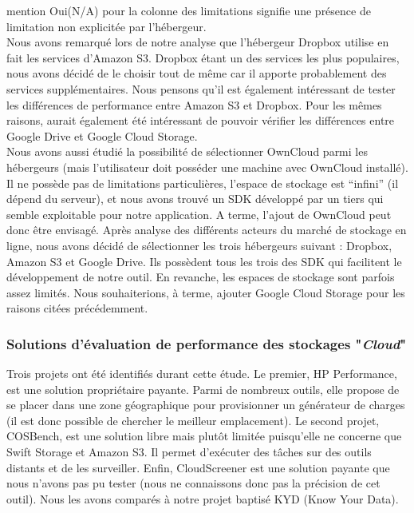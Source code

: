 \documentclass[10pt]{article}
\begin{document}
mention Oui(N/A) pour la colonne des limitations signifie une présence de
limitation non explicitée par l'hébergeur.\\

Nous avons remarqué lors de notre analyse que l’hébergeur Dropbox utilise en
fait les services d'Amazon S3. Dropbox étant un des services les plus
populaires, nous avons décidé de le choisir tout de même car il apporte
probablement des services supplémentaires. Nous pensons qu’il est également
intéressant de tester les différences de performance entre Amazon S3 et Dropbox.
Pour les mêmes raisons, aurait également été intéressant de pouvoir vérifier les
différences entre Google Drive et Google Cloud Storage.\\

Nous avons aussi étudié la possibilité de sélectionner OwnCloud parmi les
hébergeurs (mais l’utilisateur doit posséder une machine avec OwnCloud
installé). Il ne possède pas de limitations particulières, l’espace de stockage
est “infini” (il dépend du serveur), et nous avons trouvé un SDK développé par
un tiers qui semble exploitable pour notre application. A terme, l’ajout de
OwnCloud peut donc être envisagé. Après analyse des différents acteurs du marché
de stockage en ligne, nous avons décidé de sélectionner les trois hébergeurs
suivant : Dropbox, Amazon S3 et Google Drive. Ils possèdent tous les trois des
SDK qui facilitent le développement de notre outil. En revanche, les espaces de
stockage sont parfois assez limités. Nous souhaiterions, à terme, ajouter Google
Cloud Storage pour les raisons citées précédemment.

\subsubsection{Solutions d'évaluation de performance des stockages
"\textit{Cloud}"}

Trois projets ont été identifiés durant cette étude. Le premier, HP Performance,
est une solution propriétaire payante. Parmi de nombreux outils, elle propose de
se placer dans une zone géographique pour provisionner un générateur de charges
(il est donc possible de chercher le meilleur emplacement). Le second projet,
COSBench, est une solution libre mais plutôt limitée puisqu’elle ne concerne que
Swift Storage et Amazon S3. Il permet d'exécuter des tâches sur des outils
distants et de les surveiller. Enfin, CloudScreener est une solution payante que
nous n’avons pas pu tester (nous ne connaissons donc pas la précision de cet
outil). Nous les avons comparés à notre projet baptisé KYD (Know Your Data).
\end{document}
